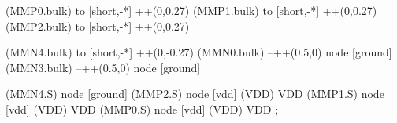 \begin{circuitikz}[american]
	(MMP0.bulk) to [short,-*] ++(0,0.27)
	(MMP1.bulk) to [short,-*] ++(0,0.27)
	(MMP2.bulk) to [short,-*] ++(0,0.27)
	
	(MMN4.bulk) to [short,-*] ++(0,-0.27)
	(MMN0.bulk) --++(0.5,0) node [ground] {}
	(MMN3.bulk) --++(0.5,0) node [ground] {}


	(MMN4.S) node [ground] {}
	(MMP2.S) node [vdd] (VDD) {VDD}
	(MMP1.S) node [vdd] (VDD) {VDD}
	(MMP0.S) node [vdd] (VDD) {VDD}
;

\end{circuitikz}
